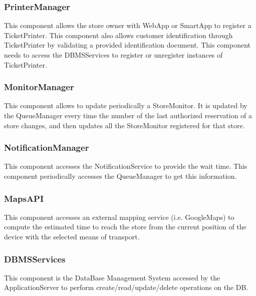 \subsubsection{PrinterManager}
This component allows the store owner with WebApp or SmartApp to register a TicketPrinter. This component also allows customer identification through TicketPrinter by validating a provided identification document. This component needs to access the DBMSServices to register or unregister instances of TicketPrinter.
\subsubsection{MonitorManager}
This component allows to update periodically a StoreMonitor. It is updated by the QueueManager every time the number of the last authorized reservation of a store changes, and then updates all the StoreMonitor registered for that store.
\subsubsection{NotificationManager}
This component accesses the NotificationService to provide the wait time. This component periodically accesses the QueueManager to get this information.
\subsubsection{MapsAPI}
This component accesses an external mapping service (i.e. GoogleMaps) to compute the estimated time to reach the store from the current position of the device with the selected means of transport.
\subsubsection{DBMSServices}
This component is the DataBase Management System accessed by the ApplicationServer to perform create/read/update/delete operations on the DB.
